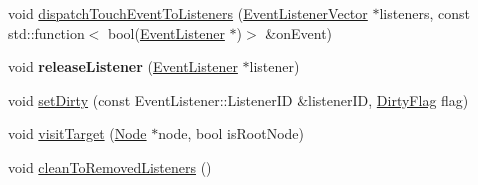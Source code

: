 \begin{DoxyCompactItemize}
\item 
void \hyperlink{classEventDispatcher_ad49739c7342d1ccf133914414559ecdd}{dispatch\+Touch\+Event\+To\+Listeners} (\hyperlink{classEventDispatcher_1_1EventListenerVector}{Event\+Listener\+Vector} $\ast$listeners, const std\+::function$<$ bool(\hyperlink{classEventListener}{Event\+Listener} $\ast$)$>$ \&on\+Event)
\item 
\mbox{\label{classEventDispatcher_a7786d95286ac416c06c4783623feda09}} 
void {\bfseries release\+Listener} (\hyperlink{classEventListener}{Event\+Listener} $\ast$listener)
\item 
void \hyperlink{classEventDispatcher_aacdc31196bd0b1881d4e2b807134882f}{set\+Dirty} (const Event\+Listener\+::\+Listener\+ID \&listener\+ID, \hyperlink{classEventDispatcher_a05d949544dae4e41a1ba912ab962db33}{Dirty\+Flag} flag)
\item 
void \hyperlink{classEventDispatcher_a3ff088a3e3479d3ffd661c5918bff912}{visit\+Target} (\hyperlink{classNode}{Node} $\ast$node, bool is\+Root\+Node)
\item 
void \hyperlink{classEventDispatcher_ac4610bd51dadf12ab82b1793e26340c6}{clean\+To\+Removed\+Listeners} ()
\end{DoxyCompactItemize}
